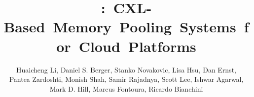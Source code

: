 
\def \mytitle {\mbox{\sys: CXL-Based Memory Pooling Systems for Cloud Platforms}}

\title{\bf \mytitle}

%



\def \ispace {\textcolor{white}{\rule{1.8in}{1pt}}}

\author{Huaicheng Li\sdag, Daniel S. Berger\sstar\sddag, Stanko Novakovic\sstar, Lisa Hsu\sstar, Dan Ernst\sstar, \\ Pantea Zardoshti\sstar, Monish Shah\sstar, Samir Rajadnya\sstar, Scott Lee\sstar, Ishwar Agarwal\sstar,\\
Mark D. Hill\sstar\scircle, Marcus Fontoura\sstar, Ricardo Bianchini\sstar \\ \quad {}\quad {}\quad {}}

\date{}
\maketitle
